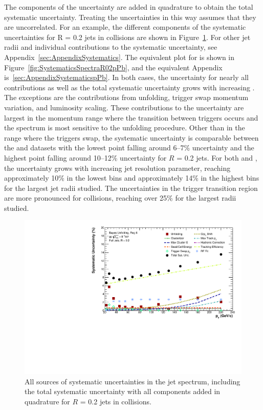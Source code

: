 The components of the uncertainty are added in quadrature to obtain the total systematic uncertainty. Treating the uncertainties in this way assumes that they are uncorrelated. For an example, the different components of the systematic uncertainties for R = 0.2 jets in \pp collisions are shown in Figure~\ref{fig:SystematicsSpectraR02}. For other jet radii and individual contributions to the systematic uncertainty, see Appendix~\ref{sec:AppendixSystematics}. The equivalent plot for \pPb is shown in Figure~\ref{fig:SystematicsSpectraR02pPb}, and the equivalent Appendix is~\ref{sec:AppendixSystematicspPb}. In both cases, the uncertainty for nearly all contributions as well as the total systematic uncertainty grows with increasing \pT. The exceptions are the contributions from unfolding, trigger swap momentum variation, and luminosity scaling. These contributions to the uncertainty are largest in the momentum range where the transition between triggers occurs and the spectrum is most sensitive to the unfolding procedure. Other than in the \pT range where the triggers swap, the systematic uncertainty is comparable between the \pp and \pPb datasets with the lowest \pT point falling around 6--7\% uncertainty and the highest \pT point falling around 10--12\% uncertainty for $R$ = 0.2 jets. For both \pp and \pPb, the uncertainty grows with increasing jet resolution parameter, reaching approximately 10\% in the lowest \pT bins and approximately 14\% in the highest \pT bins for the largest jet radii studied. The uncertainties in the trigger transition region are more pronounced for \pPb collisions, reaching over 25\% for the largest radii studied.


\begin{figure}[hbt!]
    \centering
    \includegraphics[width=15cm]{figures/Systematics/TotalSystematics_R02.pdf}
    \caption{All sources of systematic uncertainties in the jet spectrum, including the total systematic uncertainty with all components added in quadrature for $R$ = 0.2 jets in \pp collisions.}
    \label{fig:SystematicsSpectraR02}
\end{figure}

